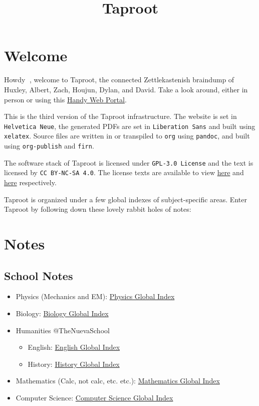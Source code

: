 \documentclass[letterpaper]{article}
\date{}
\title{Taproot}
\begin{document}
\section{Welcome}
\label{sec:orgf030131}
Howdy 👋, welcome to Taproot, the connected Zettlekastenish braindump of Huxley, Albert, Zach, Houjun, Dylan, and David. Take a look around, either in person or using this \href{https://taproot3.sanity.gq}{Handy Web Portal}.

This is the third version of the Taproot infrastructure. The website is set in \texttt{Helvetica Neue}, the generated PDFs are set in \texttt{Liberation Sans} and built using \texttt{xelatex}. Source files are written in or transpiled to \texttt{org} using \texttt{pandoc}, and built using \texttt{org-publish} and \texttt{firn}.

The software stack of Taproot is licensed under \texttt{GPL-3.0 License} and the text is licensed by \texttt{CC BY-NC-SA 4.0}. The license texts are available to view \href{https://www.gnu.org/licenses/gpl-3.0.en.html}{here} and \href{https://creativecommons.org/licenses/by-nc-sa/2.0/}{here} respectively.

Taproot is organized under a few global indexes of subject-specific areas. Enter Taproot by following down these lovely rabbit holes of notes:

\section{Notes}
\label{sec:org7bf776e}

\subsection{School Notes}
\label{sec:org86c8e41}
\begin{itemize}
\item Physics (Mechanics and EM): \href{physics/index.org}{Physics Global Index}
\item Biology: \href{biology/index.org}{Biology Global Index}
\item Humanities @TheNuevaSchool
\begin{itemize}
\item English: \href{english/index.org}{English Global Index}
\item History: \href{history/index.org}{History Global Index}
\end{itemize}
\item Mathematics (Calc, not calc, etc. etc.): \href{mathematics/index.org}{Mathematics Global Index}
\item Computer Science: \href{cs/index.org}{Computer Science Global Index}
\end{itemize}
\end{document}

